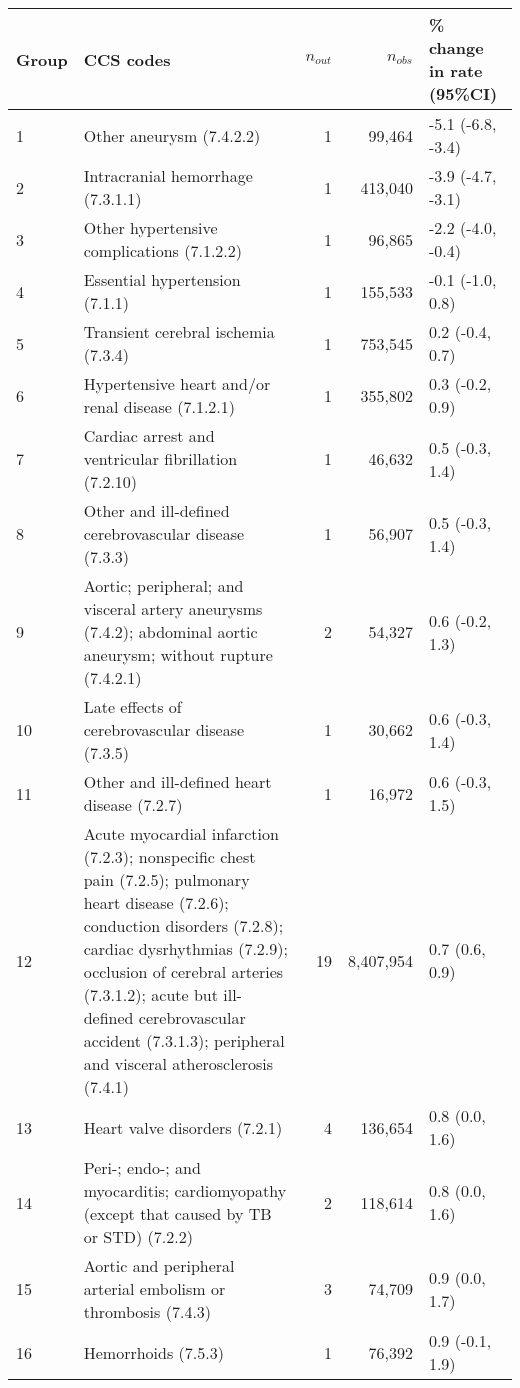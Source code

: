 \begin{tabular}{lp{6.5cm}rrp{2.2cm}}
  \hline
Group & CCS codes & $n_{out}$ & $n_{obs}$ & \% change in rate (95\%CI) \\ 
  \hline
 1 & Other aneurysm (7.4.2.2) &  1 & 99,464 & -5.1 (-6.8, -3.4) \\ 
   2 & Intracranial hemorrhage (7.3.1.1) &  1 & 413,040 & -3.9 (-4.7, -3.1) \\ 
   3 & Other hypertensive complications (7.1.2.2) &  1 & 96,865 & -2.2 (-4.0, -0.4) \\ 
   4 & Essential hypertension (7.1.1) &  1 & 155,533 & -0.1 (-1.0, 0.8) \\ 
   5 & Transient cerebral ischemia (7.3.4) &  1 & 753,545 & 0.2 (-0.4, 0.7) \\ 
   6 & Hypertensive heart and/or renal disease (7.1.2.1) &  1 & 355,802 & 0.3 (-0.2, 0.9) \\ 
   7 & Cardiac arrest and ventricular fibrillation (7.2.10) &  1 & 46,632 & 0.5 (-0.3, 1.4) \\ 
   8 & Other and ill-defined cerebrovascular disease (7.3.3) &  1 & 56,907 & 0.5 (-0.3, 1.4) \\ 
   9 & Aortic; peripheral; and visceral artery aneurysms (7.4.2); abdominal aortic aneurysm; without rupture (7.4.2.1) &  2 & 54,327 & 0.6 (-0.2, 1.3) \\ 
  10 & Late effects of cerebrovascular disease (7.3.5) &  1 & 30,662 & 0.6 (-0.3, 1.4) \\ 
  11 & Other and ill-defined heart disease (7.2.7) &  1 & 16,972 & 0.6 (-0.3, 1.5) \\ 
  12 & Acute myocardial infarction (7.2.3); nonspecific chest pain (7.2.5); pulmonary heart disease (7.2.6); conduction disorders (7.2.8); cardiac dysrhythmias (7.2.9); occlusion of cerebral arteries (7.3.1.2); acute but ill-defined cerebrovascular accident (7.3.1.3); peripheral and visceral atherosclerosis (7.4.1) & 19 & 8,407,954 & 0.7 (0.6, 0.9) \\ 
  13 & Heart valve disorders (7.2.1) &  4 & 136,654 & 0.8 (0.0, 1.6) \\ 
  14 & Peri-; endo-; and myocarditis; cardiomyopathy (except that caused by TB or STD) (7.2.2) &  2 & 118,614 & 0.8 (0.0, 1.6) \\ 
  15 & Aortic and peripheral arterial embolism or thrombosis (7.4.3) &  3 & 74,709 & 0.9 (0.0, 1.7) \\ 
  16 & Hemorrhoids (7.5.3) &  1 & 76,392 & 0.9 (-0.1, 1.9) \\ 

\end{tabular}
